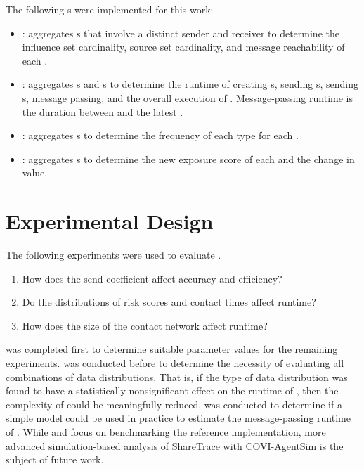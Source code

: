 The following s were implemented for this work:
\begin{itemize}
  \item {}: aggregates s that involve a distinct sender and receiver to determine the influence set cardinality, source set cardinality, and message reachability of each .
  \item {}: aggregates s and s to determine the runtime of creating s, sending s, sending s, message passing, and the overall execution of . Message-passing runtime is the duration between  and the latest .
  \item {}: aggregates s to determine the frequency of each type for each .
  \item {}: aggregates s to determine the new exposure score of each  and the change in value.
\end{itemize}

\section{Experimental Design}\label{sec:experimental-design}

The following experiments were used to evaluate .
\begin{enumerate}[ref={Experiment \arabic*}]
  \item How does the send coefficient affect accuracy and efficiency?\label{item:parameters}
  \item Do the distributions of risk scores and contact times affect runtime?\label{item:distributions}
  \item How does the size of the contact network affect runtime?\label{item:topology}
\end{enumerate}

 was completed first to determine suitable parameter values for the remaining experiments.  was conducted before  to determine the necessity of evaluating all combinations of data distributions. That is, if the type of data distribution was found to have a statistically nonsignificant effect on the runtime of , then the complexity of  could be meaningfully reduced.  was conducted to determine if a simple model could be used in practice to estimate the message-passing runtime of . While  and  focus on benchmarking the reference implementation, more advanced simulation-based analysis of ShareTrace with COVI-AgentSim \citep{Gupta2020} is the subject of future work.

